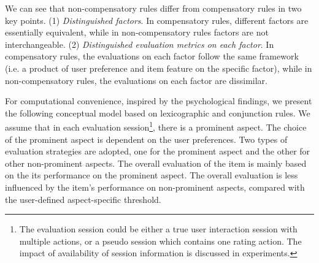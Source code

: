 \documentclass[letterpaper]{article} %
\begin{document}
%

We can see that non-compensatory rules differ from compensatory rules in two key points. (1) \textit{Distinguished factors}. In compensatory rules, different factors are essentially equivalent, while in non-compensatory rules factors are not interchangeable. (2) \textit{Distinguished evaluation metrics on each factor}. In compensatory rules, the evaluations on each factor follow the same framework (i.e. a product of user preference and item feature on the specific factor), while in non-compensatory rules, the evaluations on each factor are dissimilar.  

For computational convenience, inspired by the psychological findings, we present the following conceptual model based on lexicographic and conjunction rules. We assume that in each evaluation session\footnote{The evaluation session could be either a true user interaction session with multiple actions, or a pseudo session which contains one rating action. The impact of availability of session information is discussed in experiments. }, there is a prominent aspect. The choice of the prominent aspect is dependent on the user preferences. Two types of evaluation strategies are adopted, one for the prominent aspect and the other for other non-prominent aspects. The overall evaluation of the item is mainly based on the its performance on the prominent aspect. The overall evaluation is less influenced by the item's performance on non-prominent aspects, compared with the user-defined aspect-specific threshold.
\end{document}
